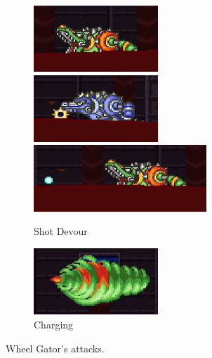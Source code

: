 \begin{figure}
	\ContinuedFloat
	\centering
	\begin{subfigure}{\linewidth}
		\centering
		\includegraphics[height=2.5cm]{figures/X2/Wheel_gator/Gator_mouth.png}
		\includegraphics[height=2.5cm]{figures/X2/Wheel_gator/Gator_absorb.png}
		\vspace{1pt}\\
		\includegraphics[height=2.5cm]{figures/X2/Wheel_gator/Gator_spit.png}
		\caption{Shot Devour}
	\end{subfigure}
	\begin{subfigure}{0.8\linewidth}
		\centering
		\includegraphics[height=2.5cm]{figures/X2/Wheel_gator/Gator_DM.png}
		\caption{Charging}
	\end{subfigure}
	\caption{Wheel Gator's attacks.}	
\end{figure}
